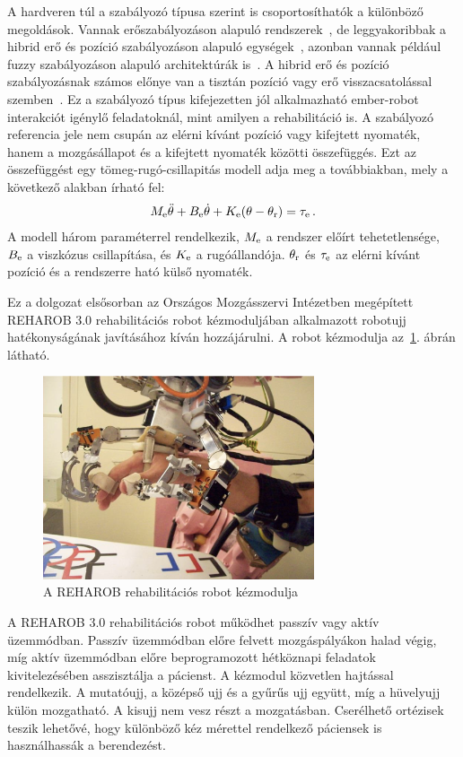 A hardveren túl a szabályozó típusa szerint is csoportosíthatók a különböző megoldások. Vannak erőszabályozáson 
alapuló rendszerek~\cite{kovacs2003dynamics}, de leggyakoribbak a hibrid erő és 
pozíció szabályozáson alapuló egységek~\cite{Hua2019,Xie2021}, azonban vannak például fuzzy szabályozáson alapuló architektúrák is~\cite{Hu2023}.
A hibrid erő és pozíció szabályozásnak számos előnye van a tisztán pozíció vagy erő visszacsatolással 
szemben~\cite{hogan1984Impedance,hogan1985ImpedancePART1,hogan1985ImpedancePART2,hogan1985ImpedancePART3,kovacs2003dynamics,stepan2001vibrations}.
Ez a szabályozó típus kifejezetten jól alkalmazható ember-robot interakciót igénylő feladatoknál, mint amilyen 
a rehabilitáció is. A szabályozó referencia jele nem csupán 
az elérni kívánt pozíció vagy kifejtett nyomaték, hanem a mozgásállapot és a kifejtett
nyomaték közötti összefüggés. Ezt az összefüggést egy 
tömeg-rugó-csillapitás modell adja meg a továbbiakban, mely a következő alakban
írható fel: 
\begin{align}
    M_{\mathrm{e}} \ddot \theta + B_{\mathrm{e}} \dot \theta + K_{\mathrm{e}} (\theta - \theta_{\mathrm{r}}) = \tau_{\mathrm{e}}\,.
\end{align}
A modell három paraméterrel rendelkezik, $M_{\mathrm{e}}$ a rendszer előírt tehetetlensége, 
$B_{\mathrm{e}}$ a viszkózus csillapítása, és $K_{\mathrm{e}}$ a rugóállandója. 
$\theta_{\mathrm{r}}$ és $\tau_{\mathrm{e}}$ az elérni kívánt pozíció és a rendszerre ható külső nyomaték. 

Ez a dolgozat elsősorban az Országos Mozgásszervi Intézetben megépített REHAROB 3.0 
rehabilitációs robot kézmoduljában alkalmazott robotujj hatékonyságának javításához kíván hozzájárulni.
A robot kézmodulja az~\ref{fig:reharob_hand_module}. ábrán látható.
\begin{figure}[H]
    \begin{center}
    \includegraphics[width=8cm]{images/reharob_hand_module.png}
    \caption{A REHAROB rehabilitációs robot kézmodulja}\label{fig:reharob_hand_module}
    \end{center}
\end{figure}
A REHAROB 3.0 rehabilitációs robot működhet passzív vagy aktív üzemmódban. Passzív üzemmódban előre felvett 
mozgáspályákon halad végig, míg aktív üzemmódban előre beprogramozott hétköznapi feladatok 
kivitelezésében asszisztálja a pácienst. A kézmodul közvetlen hajtással rendelkezik. A mutatóujj, a középső ujj és a
gyűrűs ujj együtt, míg a hüvelyujj külön mozgatható. A kisujj nem vesz részt a mozgatásban. Cserélhető ortézisek 
teszik lehetővé, hogy különböző kéz mérettel rendelkező páciensek is használhassák a berendezést.

